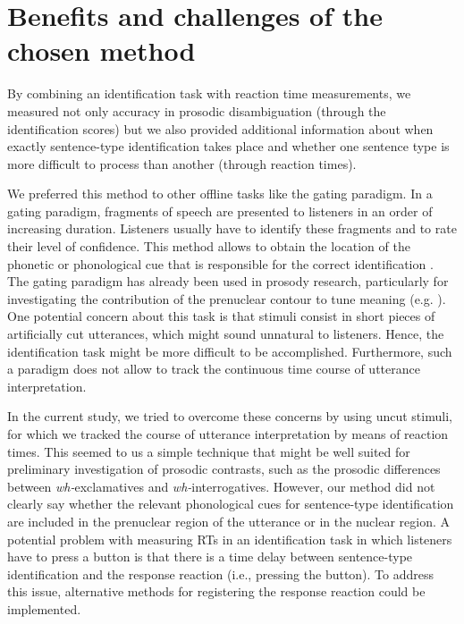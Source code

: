 \documentclass[output=paper]{langsci/langscibook}
\begin{document}
\section{Benefits and challenges of the chosen method}
\label{sec:kel:7}

By combining an identification task with reaction time measurements, we measured not only accuracy in prosodic disambiguation (through the identification scores) but we also provided additional information about when exactly sentence-type identification takes place and whether one sentence type is more difficult to process than another (through reaction times).

We preferred this method to other offline tasks like the gating paradigm. In a gating paradigm, fragments of speech are presented to listeners in an order of increasing duration. Listeners usually have to identify these fragments and to rate their level of confidence. This method allows to obtain the location of the phonetic or phonological cue that is responsible for the correct identification \citep{Prieto.2012}. The gating paradigm has already been used in prosody research, particularly for investigating the contribution of the prenuclear contour to tune meaning (e.g. \citealt{Petrone2008,Petrone.2011,Sorianello2012,Prieto.2012}). One potential concern about this task is that stimuli consist in short pieces of artificially cut utterances, which might sound unnatural to listeners. Hence, the identification task might be more difficult to be accomplished. Furthermore, such a paradigm does not allow to track the continuous time course of utterance interpretation.

In the current study, we tried to overcome these concerns by using uncut stimuli, for which we tracked the course of utterance interpretation by means of reaction times. This seemed to us a simple technique that might be well suited for preliminary investigation of prosodic contrasts, such as the prosodic differences between \textit{wh-}exclamatives and \textit{wh-}interrogatives. However, our method did not clearly say whether the relevant phonological cues for sentence-type identification are included in the prenuclear region of the utterance or in the nuclear region. A potential problem with measuring RTs in an identification task in which listeners have to press a button is that there is a time delay between sentence-type identification and the response reaction (i.e., pressing the button). To address this issue, alternative methods for registering the response reaction could be implemented.
\end{document}
